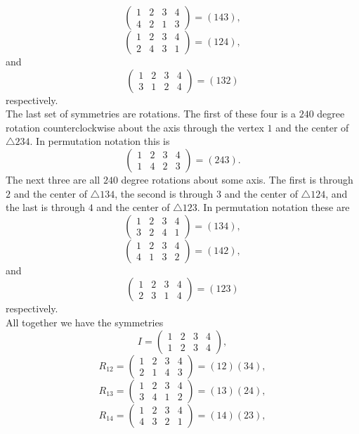 \documentclass[11pt,a4paper]{article}
\begin{document}
\[\begin{pmatrix}1&2&3&4\\4&2&1&3\end{pmatrix} = (143),\]
\[\begin{pmatrix}1&2&3&4\\2&4&3&1\end{pmatrix} = (124),\]
and
\[\begin{pmatrix}1&2&3&4\\3&1&2&4\end{pmatrix} = (132)\]
respectively.\\
The last set of symmetries are rotations. The first of these four is a $240$ degree rotation counterclockwise about the axis through the vertex $1$ and the center of $\triangle 234$. In permutation notation this is
\[\begin{pmatrix}1&2&3&4\\1&4&2&3\end{pmatrix} = (243).\]
The next three are all $240$ degree rotations about some axis. The first is through $2$ and the center of $\triangle 134$, the second is through $3$ and the center of $\triangle 124$, and the last is through $4$ and the center of $\triangle 123$. In permutation notation these are
\[\begin{pmatrix}1&2&3&4\\3&2&4&1\end{pmatrix} = (134),\]
\[\begin{pmatrix}1&2&3&4\\4&1&3&2\end{pmatrix} = (142),\]
and
\[\begin{pmatrix}1&2&3&4\\2&3&1&4\end{pmatrix} = (123)\]
respectively.\\
All together we have the symmetries
\[I = \begin{pmatrix}1&2&3&4\\1&2&3&4\end{pmatrix},\]
\[R_{12} = \begin{pmatrix}1&2&3&4\\2&1&4&3\end{pmatrix} = (12)(34),\]
\[R_{13} = \begin{pmatrix}1&2&3&4\\3&4&1&2\end{pmatrix} = (13)(24),\]
\[R_{14} = \begin{pmatrix}1&2&3&4\\4&3&2&1\end{pmatrix} = (14)(23),\]
\end{document}
